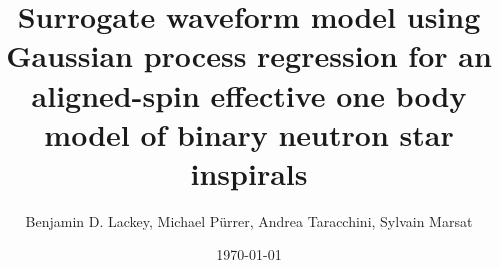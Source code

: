 \documentclass[prd,aps,letter,twocolumn,floatfix,notitlepage,nofootinbib]{revtex4-1}
\newcommand{\red}[1]{\textcolor{red}{#1}}
\begin{document}
\title{Surrogate waveform model using Gaussian process regression for an aligned-spin effective one body model of binary neutron star inspirals}

\author{
Benjamin D. Lackey, 
Michael P\"{u}rrer, 
Andrea Taracchini,
Sylvain Marsat
}

\date{\today}

\begin{abstract}



\end{abstract}
\end{document}
